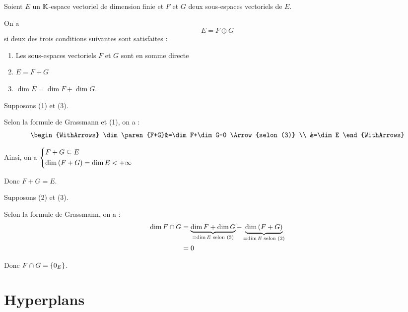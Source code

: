 \begin{prop}
Soient \(E\) un \(\mathbb{K}\)-espace vectoriel de dimension finie et \(F\) et \(G\) deux sous-espaces vectoriels de \(E\).

On a \[E=F\oplus G\] si deux des trois conditions suivantes sont satisfaites :

\begin{enumerate}
\item Les sous-espaces vectoriels \(F\) et \(G\) sont en somme directe \\

\item \(E=F+G\) \\

\item \(\dim E=\dim F+\dim G\).
\end{enumerate}
\end{prop}

\begin{dem}[((1) et (3))\(\imp\)(2)]
Supposons (1) et (3).

Selon la formule de Grassmann et (1), on a : \[\begin{WithArrows}
\dim\paren{F+G}&=\dim F+\dim G-0 \Arrow{selon (3)} \\
&=\dim E
\end{WithArrows}\]

Ainsi, on a \(\begin{dcases}
F+G\subseteq E \\
\dim\left(F+G\right)=\dim E<+\infty
\end{dcases}\)

Donc \(F+G=E\).
\end{dem}

\begin{dem}[((2) et (3))\(\imp\)(1)]
Supposons (2) et (3).

Selon la formule de Grassmann, on a : \[\begin{aligned}
\dim F\cap G&=\underbrace{\dim F+\dim G}_{=\dim E\text{ selon (3)}}-\underbrace{\dim\left(F+G\right)}_{=\dim E\text{ selon (2)}} \\
&=0
\end{aligned}\]

Donc \(F\cap G=\left\lbrace0_E\right\rbrace\).
\end{dem}

\section{Hyperplans}

